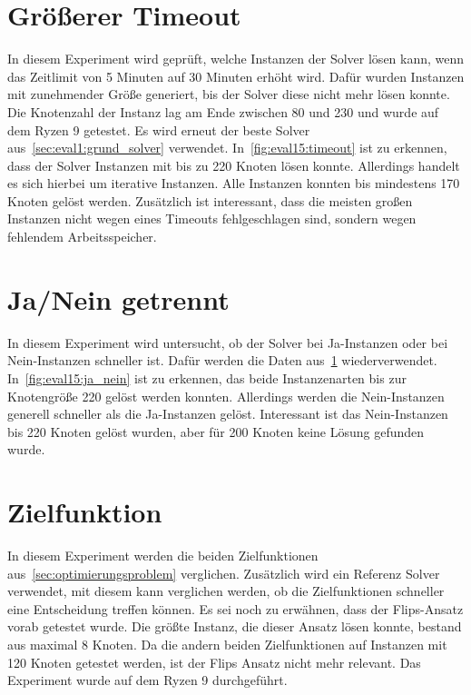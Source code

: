 \section{Größerer Timeout}
\label{sec:großer_timeout}
In diesem Experiment wird geprüft, welche Instanzen der Solver lösen kann, wenn das Zeitlimit von 5 Minuten auf 30 Minuten erhöht wird.
Dafür wurden Instanzen mit zunehmender Größe generiert, bis der Solver diese nicht mehr lösen konnte.
Die Knotenzahl der Instanz lag am Ende zwischen 80 und 230 und wurde auf dem Ryzen 9 getestet.
Es wird erneut der beste Solver aus~\cref{sec:eval1:grund_solver} verwendet.
In~\cref{fig:eval15:timeout} ist zu erkennen, dass der Solver Instanzen mit bis zu 220 Knoten lösen konnte.
Allerdings handelt es sich hierbei um iterative Instanzen.
Alle Instanzen konnten bis mindestens 170 Knoten gelöst werden.
Zusätzlich ist interessant, dass die meisten großen Instanzen nicht wegen eines Timeouts fehlgeschlagen sind, sondern wegen fehlendem Arbeitsspeicher.



\section{Ja/Nein getrennt}
In diesem Experiment wird untersucht, ob der Solver bei Ja-Instanzen oder bei Nein-Instanzen schneller ist.
Dafür werden die Daten aus~\cref{sec:großer_timeout} wiederverwendet.
In~\cref{fig:eval15:ja_nein} ist zu erkennen, das beide Instanzenarten bis zur Knotengröße 220 gelöst werden konnten.
Allerdings werden die Nein-Instanzen generell schneller als die Ja-Instanzen gelöst.
Interessant ist das Nein-Instanzen bis 220 Knoten gelöst wurden, aber für 200 Knoten keine Lösung gefunden wurde.


\section{Zielfunktion}
\label{sec:eval11}
In diesem Experiment werden die beiden Zielfunktionen aus~\cref{sec:optimierungsproblem} verglichen.
Zusätzlich wird ein Referenz Solver verwendet, mit diesem kann verglichen werden, ob die Zielfunktionen schneller eine Entscheidung treffen können.
Es sei noch zu erwähnen, dass der Flips-Ansatz vorab getestet wurde.
Die größte Instanz, die dieser Ansatz lösen konnte, bestand aus maximal 8 Knoten.
Da die andern beiden Zielfunktionen auf Instanzen mit 120 Knoten getestet werden, ist der Flips Ansatz nicht mehr relevant.
Das Experiment wurde auf dem Ryzen 9 durchgeführt.

